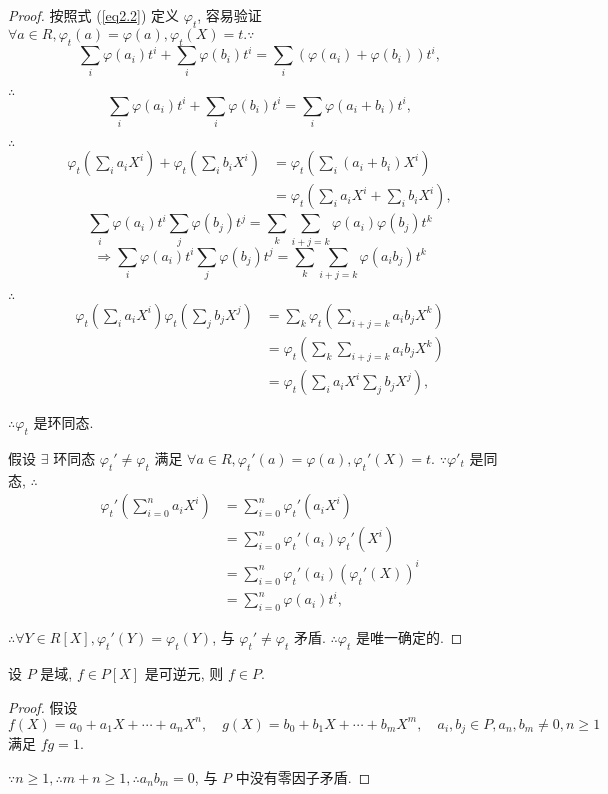 \documentclass[UTF8]{ctexart}
\begin{document}
\begin{proof}
    按照式 (\ref{eq2.2}) 定义 $\varphi_t$, 容易验证 $\forall a\in R,\varphi_t(a)=\varphi(a),\varphi_t(X)=t.\because$
    \[\sum\limits_i\varphi(a_i)t^i+\sum\limits_i\varphi(b_i)t^i=\sum\limits_i(\varphi(a_i)+\varphi(b_i))t^i,\]
    
    $\therefore$
    \[\sum\limits_i\varphi(a_i)t^i+\sum\limits_i\varphi(b_i)t^i=\sum\limits_i\varphi(a_i+b_i)t^i,\]
    
    $\therefore$
    \begin{align*}
        \varphi_t\left(\sum\limits_ia_iX^i\right)+\varphi_t\left(\sum\limits_ib_iX^i\right) & =\varphi_t\left(\sum\limits_i(a_i+b_i)X^i\right) \\
        & =\varphi_t\left(\sum\limits_ia_iX^i+\sum\limits_ib_iX^i\right),
    \end{align*}
    \[\sum\limits_i\varphi(a_i)t^i\sum\limits_j\varphi(b_j)t^j=\sum\limits_k\sum\limits_{i+j=k}\varphi(a_i)\varphi(b_j)t^k\]
    \[\Rightarrow\sum\limits_i\varphi(a_i)t^i\sum\limits_j\varphi(b_j)t^j=\sum\limits_k\sum\limits_{i+j=k}\varphi(a_ib_j)t^k\]
    
    $\therefore$
    \begin{align*}
        \varphi_t\left(\sum\limits_ia_iX^i\right)\varphi_t\left(\sum\limits_jb_jX^j\right) & =\sum\limits_k\varphi_t\left(\sum\limits_{i+j=k}a_ib_jX^k\right) \\
        & =\varphi_t\left(\sum\limits_k\sum\limits_{i+j=k}a_ib_jX^k\right) \\
        & =\varphi_t\left(\sum\limits_ia_iX^i\sum\limits_jb_jX^j\right),
    \end{align*}

    $\therefore\varphi_t$ 是环同态.

    假设 $\exists$ 环同态 $\varphi_t'\neq\varphi_t$ 满足 $\forall a\in R,\varphi_t'(a)=\varphi(a),\varphi_t'(X)=t$. $\because\varphi'_t$ 是同态, $\therefore$
    \begin{align*}
        \varphi_t'\left(\sum\limits_{i=0}^{n}a_iX^i\right) & =\sum\limits_{i=0}^{n}\varphi_t'\left(a_iX^i\right) \\
        & =\sum\limits_{i=0}^{n}\varphi_t'(a_i)\varphi_t'\left(X^i\right) \\
        & =\sum\limits_{i=0}^{n}\varphi_t'(a_i)(\varphi_t'(X))^i \\
        & =\sum\limits_{i=0}^{n}\varphi(a_i)t^i,
    \end{align*}

    $\therefore\forall Y\in R[X],\varphi_t'(Y)=\varphi_t(Y)$, 与 $\varphi_t'\neq\varphi_t$ 矛盾. $\therefore\varphi_t$ 是唯一确定的.
\end{proof}
\begin{theorem}
    设 $P$ 是域, $f\in P[X]$ 是可逆元, 则 $f\in P$.
\end{theorem}
\begin{proof}
    假设
    \[f(X)=a_0+a_1X+\cdots+a_nX^n,\quad g(X)=b_0+b_1X+\cdots+b_mX^m,\quad a_i,b_j\in P,a_n,b_m\neq0,n\geq1\]
    满足 $fg=1$.

    $\because n\geq1,\therefore m+n\geq1,\therefore a_nb_m=0$, 与 $P$ 中没有零因子矛盾.
\end{proof}
\end{document}
